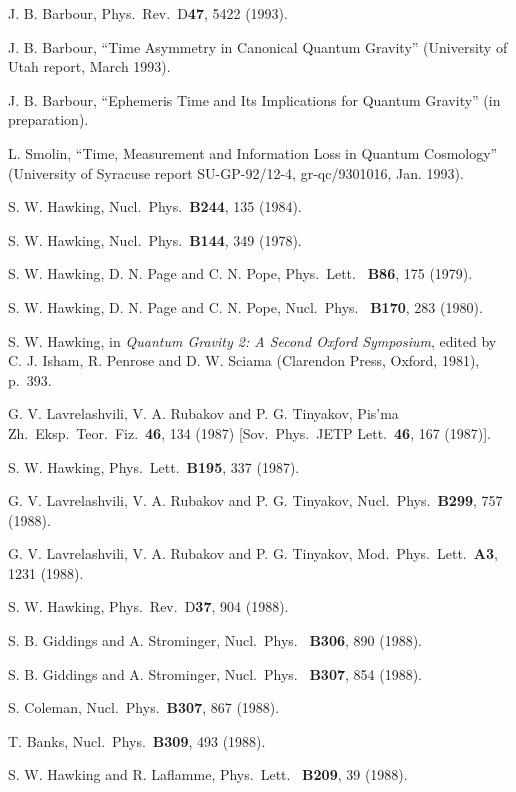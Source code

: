 \begin{thebibliography}{999}
 J. B. Barbour, Phys.\ Rev.\ D{\bf 47}, 5422 (1993).

 J. B. Barbour, ``Time Asymmetry in Canonical Quantum
Gravity''
(University of Utah report, March 1993).

 J. B. Barbour, ``Ephemeris Time and Its Implications
for
Quantum
Gravity'' (in preparation).

 L. Smolin, ``Time, Measurement and Information Loss in
Quantum
Cosmology'' (University of Syracuse report SU-GP-92/12-4,
gr-qc/9301016, Jan.
1993).

 S. W. Hawking, Nucl.\ Phys.\ {\bf B244}, 135 (1984).

 S. W. Hawking, Nucl.\ Phys.\ {\bf B144}, 349 (1978).

 S. W. Hawking, D. N. Page and C. N. Pope, Phys.\ Lett.\
{\bf
B86},
175 (1979).

 S. W. Hawking, D. N. Page and C. N. Pope, Nucl.\ Phys.\
{\bf
B170}, 283 (1980).

 S. W. Hawking, in {\em Quantum Gravity 2:  A Second
Oxford
Symposium}, edited by C. J. Isham, R. Penrose and D. W. Sciama
(Clarendon
Press, Oxford, 1981), p.~393.

 G. V. Lavrelashvili, V. A. Rubakov and P. G. Tinyakov,
Pis'ma
Zh.\
Eksp.\ Teor.\ Fiz.\ {\bf 46}, 134 (1987) [Sov.\ Phys.\ JETP Lett.\
{\bf 46},
167 (1987)].

\bibitem{w4} S. W. Hawking, Phys.\ Lett.\ {\bf B195}, 337 (1987).

\bibitem{w5} G. V. Lavrelashvili, V. A. Rubakov and P. G. Tinyakov,
Nucl.\
Phys.\ {\bf B299}, 757 (1988).

 G. V. Lavrelashvili, V. A. Rubakov and P. G. Tinyakov,
Mod.\
Phys.\ Lett.\ {\bf A3}, 1231 (1988).

\bibitem{w6} S. W. Hawking, Phys.\ Rev.\ D{\bf 37}, 904 (1988).

\bibitem{w7a} S. B. Giddings and A. Strominger, Nucl.\ Phys.\ {\bf
B306}, 890
(1988).

\bibitem{w7} S. B. Giddings and A. Strominger, Nucl.\ Phys.\ {\bf
B307}, 854
(1988).

 S. Coleman, Nucl.\ Phys.\ {\bf B307}, 867 (1988).

\bibitem{w9} T. Banks, Nucl.\ Phys.\ {\bf B309}, 493 (1988).

 S. W. Hawking and R. Laflamme, Phys.\ Lett.\ {\bf
B209}, 39
(1988).


\end{thebibliography}
